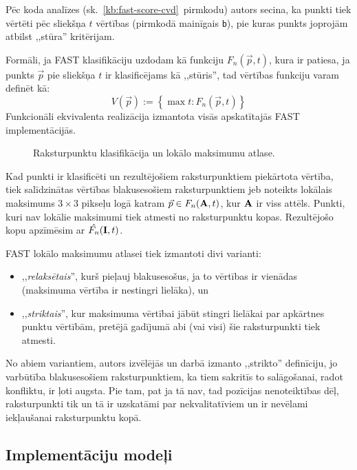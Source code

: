 Pēc koda analīzes (sk.~\ref{kb:fast-score-cvd}~pirmkodu)
autors secina, ka punkti tiek vērtēti pēc sliekšņa $t$ vērtības
(pirmkodā mainīgais \texttt{b}), pie kuras
punkts joprojām atbilst ,,stūra'' kritērijam.

Formāli, ja FAST klasifikāciju uzdodam kā funkciju $F_n(\vec{p}, t)$,
kura ir patiesa, ja punkts $\vec{p}$ pie sliekšņa $t$ ir klasificējams
kā ,,stūris'', tad vērtības funkciju varam definēt kā:
\begin{equation}\label{eq:fast-response}
	V(\vec{p}) := \left\{ \max{t} : F_n(\vec{p}, t) \right\}
\end{equation}
Funkcionāli ekvivalenta realizācija izmantota visās apskatītajās FAST
implementācijās.


\begin{figure}[tbh]
	\centering
	\def\svgwidth{0.8\linewidth}
	{}
	\caption{Raksturpunktu klasifikācija un lokālo maksimumu atlase.}
	\label{fig:nonmax}
\end{figure}

Kad punkti ir klasificēti un rezultējošiem raksturpunktiem piekārtota
vērtība, tiek salīdzinātas vērtības blakusesošiem raksturpunktiem
jeb
noteikts lokālais maksimums $3 \times 3$ pikseļu logā katram
\label{sym:A}
$\vec{p} \in F_n(\mathbf{A}, t)$, kur $\mathbf{A}$ ir viss attēls.
Punkti, kuri nav lokālie maksimumi tiek atmesti no raksturpunktu kopas.
Rezultējošo kopu apzīmēsim ar $\hat{F_n}(\mathbf{I}, t)$.

FAST lokālo maksimumu atlasei tiek izmantoti divi varianti:
\begin{itemize}
	\item ,,\emph{relaksētais}'', kurš pieļauj blakusesošus, ja to
		vērtības ir vienādas (maksimuma vērtība ir nestingri lielāka), un
	\item ,,\emph{striktais}'', kur maksimuma vērtībai jābūt stingri
		lielākai par apkārtnes punktu vērtībām, pretējā gadījumā abi (vai
		visi) šie raksturpunkti tiek atmesti.
\end{itemize}
No abiem variantiem, autors izvēlējās un darbā izmanto ,,strikto'' definīciju,
jo varbūtība blakusesošiem raksturpunktiem, ka tiem sakritīs to
 salāgošanai, radot konfliktu, ir ļoti augsta.
Pie tam, pat ja tā nav, tad pozīcijas nenoteiktības dēļ, raksturpunkti tik
un tā ir uzskatāmi par nekvalitatīviem un ir nevēlami iekļaušanai
raksturpunktu kopā.

\subsection{Implementāciju modeļi} \label{sec:fast-impl}




